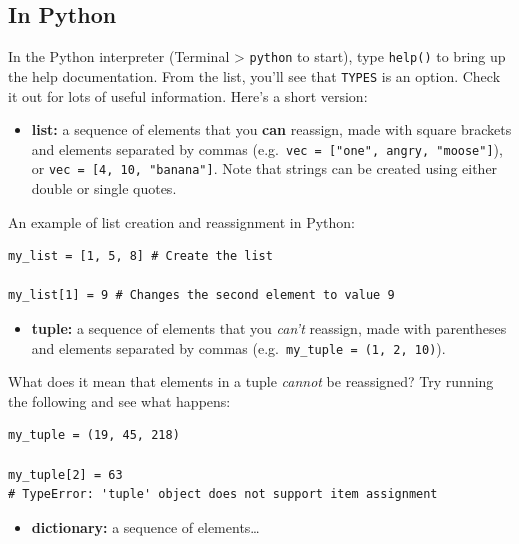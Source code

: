 \documentclass[
]{book}
\providecommand{\tightlist}{%
  \setlength{\itemsep}{0pt}\setlength{\parskip}{0pt}}
\begin{document}
\hypertarget{in-python}{%
\subsection{In Python}\label{in-python}}

In the Python interpreter (Terminal \textgreater{} \texttt{python} to start), type \texttt{help()} to bring up the help documentation. From the list, you'll see that \texttt{TYPES} is an option. Check it out for lots of useful information. Here's a short version:

\begin{itemize}
\tightlist
\item
  \textbf{list:} a sequence of elements that you \textbf{can} reassign, made with square brackets and elements separated by commas (e.g.~\texttt{vec\ =\ {[}"one",\ \textquotesingle{}angry\textquotesingle{},\ "moose"{]}}), or \texttt{vec\ =\ {[}4,\ 10,\ "banana"{]}}. Note that strings can be created using either double or single quotes.
\end{itemize}

An example of list creation and reassignment in Python:

\begin{verbatim}
my_list = [1, 5, 8] # Create the list

my_list[1] = 9 # Changes the second element to value 9
\end{verbatim}

\begin{itemize}
\tightlist
\item
  \textbf{tuple:} a sequence of elements that you \emph{can't} reassign, made with parentheses and elements separated by commas (e.g.~\texttt{my\_tuple\ =\ (1,\ 2,\ 10)}).
\end{itemize}

What does it mean that elements in a tuple \emph{cannot} be reassigned? Try running the following and see what happens:

\begin{verbatim}
my_tuple = (19, 45, 218)

my_tuple[2] = 63
# TypeError: 'tuple' object does not support item assignment
\end{verbatim}

\begin{itemize}
\tightlist
\item
  \textbf{dictionary:} a sequence of elements\ldots{}
\end{itemize}
\end{document}

